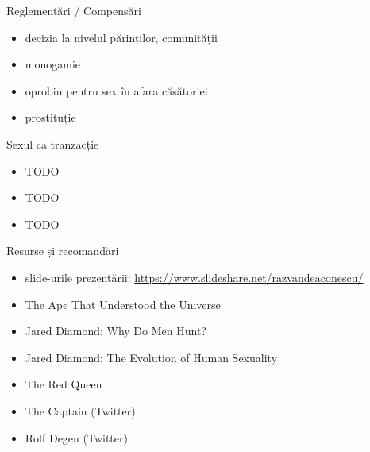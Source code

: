 \documentclass{simple}
\begin{document}
\begin{frame}{Reglementări / Compensări}
  \begin{itemize}
    \item decizia la nivelul părinților, comunității
    \item monogamie
    \item oprobiu pentru sex în afara căsătoriei
    \item prostituție
  \end{itemize}
\end{frame}

\begin{frame}{Sexul ca tranzacție}
  \begin{itemize}
    \item TODO
    \item TODO
    \item TODO
  \end{itemize}
\end{frame}

%

\begin{frame}{Resurse și recomandări}
  \begin{itemize}
    \item slide-urile prezentării: \url{https://www.slideshare.net/razvandeaconescu/}
    \item The Ape That Understood the Universe
    \item Jared Diamond: Why Do Men Hunt?
    \item Jared Diamond: The Evolution of Human Sexuality
    \item The Red Queen
    \item The Captain (Twitter)
    \item Rolf Degen (Twitter)
  \end{itemize}
\end{frame}
\end{document}
